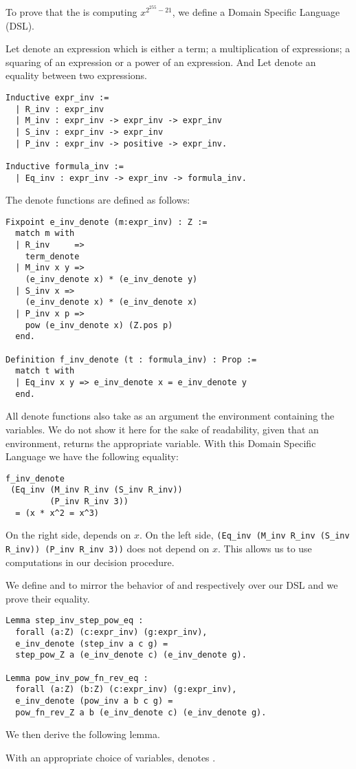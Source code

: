 To prove that the  is computing $x^{2^{255}-21}$,
we define a Domain Specific Language (DSL).
\begin{dfn}
Let  denote an expression which is either a term;
a multiplication of expressions; a squaring of an expression or a power of an expression.
And Let  denote an equality between two expressions.
\end{dfn}
\begin{lstlisting}[language=Coq]
Inductive expr_inv :=
  | R_inv : expr_inv
  | M_inv : expr_inv -> expr_inv -> expr_inv
  | S_inv : expr_inv -> expr_inv
  | P_inv : expr_inv -> positive -> expr_inv.

Inductive formula_inv :=
  | Eq_inv : expr_inv -> expr_inv -> formula_inv.
\end{lstlisting}
The denote functions are defined as follows:
\begin{lstlisting}[language=Coq]
Fixpoint e_inv_denote (m:expr_inv) : Z :=
  match m with
  | R_inv     =>
    term_denote
  | M_inv x y =>
    (e_inv_denote x) * (e_inv_denote y)
  | S_inv x =>
    (e_inv_denote x) * (e_inv_denote x)
  | P_inv x p =>
    pow (e_inv_denote x) (Z.pos p)
  end.

Definition f_inv_denote (t : formula_inv) : Prop :=
  match t with
  | Eq_inv x y => e_inv_denote x = e_inv_denote y
  end.
\end{lstlisting}
All denote functions also take as an argument the environment containing the variables.
We do not show it here for the sake of readability,
given that an environment,  returns the appropriate variable.
With this Domain Specific Language we have the following equality:
\begin{lstlisting}[backgroundcolor=\color{white}]
f_inv_denote
 (Eq_inv (M_inv R_inv (S_inv R_inv))
         (P_inv R_inv 3))
  = (x * x^2 = x^3)
\end{lstlisting}
On the right side,  depends on $x$. On the left side,
\texttt{(Eq\_inv (M\_inv R\_inv (S\_inv R\_inv)) (P\_inv R\_inv 3))} does not depend on $x$.
This allows us to use computations in our decision procedure.

We define  and  to mirror the behavior of
 and respectively  over our DSL and
we prove their equality.
\begin{lstlisting}[language=Coq]
Lemma step_inv_step_pow_eq :
  forall (a:Z) (c:expr_inv) (g:expr_inv),
  e_inv_denote (step_inv a c g) =
  step_pow_Z a (e_inv_denote c) (e_inv_denote g).

Lemma pow_inv_pow_fn_rev_eq :
  forall (a:Z) (b:Z) (c:expr_inv) (g:expr_inv),
  e_inv_denote (pow_inv a b c g) =
  pow_fn_rev_Z a b (e_inv_denote c) (e_inv_denote g).
\end{lstlisting}
We then derive the following lemma.
\begin{lemma}
\label{lemma:reify}
With an appropriate choice of variables,  denotes .
\end{lemma}

